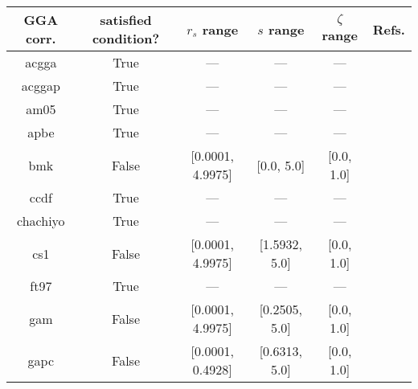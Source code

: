 \begin{tabular}{|c|c|c|c|c|l|}
\hline
      GGA corr. &  satisfied condition? &       $r_s$ range &         $s$ range &    $\zeta$ range  &                                                           Refs. \\ \hline
          acgga &                  True &               --- &               --- &               --- &                         \cite{Cancio2018_084116,Burke2014_4834} \\ \hline
         acggap &                  True &               --- &               --- &               --- &                         \cite{Cancio2018_084116,Burke2014_4834} \\ \hline
           am05 &                  True &               --- &               --- &               --- &                  \cite{Armiento2005_085108,Mattsson2008_084714} \\ \hline
           apbe &                  True &               --- &               --- &               --- &                                    \cite{Constantin2011_186406} \\ \hline
            bmk &                 False &  [0.0001, 4.9975] &        [0.0, 5.0] &        [0.0, 1.0] &                                           \cite{Boese2004_3405} \\ \hline
           ccdf &                  True &               --- &               --- &               --- &                                       \cite{Margraf2019_244116} \\ \hline
       chachiyo &                  True &               --- &               --- &               --- &                                      \cite{Chachiyo2020_112669} \\ \hline
            cs1 &                 False &  [0.0001, 4.9975] &     [1.5932, 5.0] &        [0.0, 1.0] &                           \cite{Handy2002_5411,Proynov2006_436} \\ \hline
           ft97 &                  True &               --- &               --- &               --- &                          \cite{Filatov1997_603,Filatov1997_847} \\ \hline
            gam &                 False &  [0.0001, 4.9975] &     [0.2505, 5.0] &        [0.0, 1.0] &                                             \cite{Yu2015_12146} \\ \hline
           gapc &                 False &  [0.0001, 0.4928] &     [0.6313, 5.0] &        [0.0, 1.0] &                                         \cite{Fabiano2014_2016} \\ \hline

\end{tabular}
